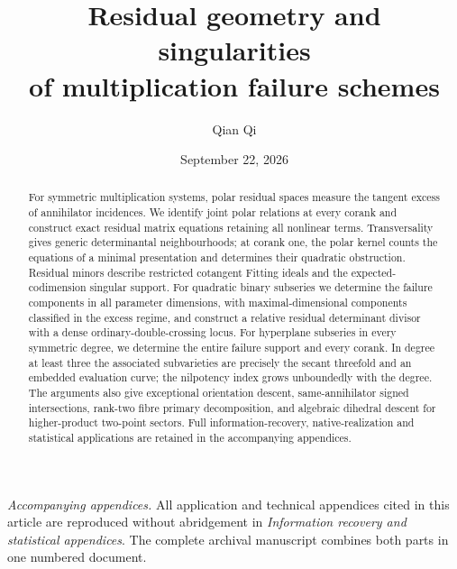 \documentclass[11pt,reqno]{amsart}
\title[Residual geometry of multiplication failure]{Residual geometry and singularities\\of multiplication failure schemes}
\author{Qian Qi}
\date{September 22, 2026}
\numberwithin{equation}{section}
\theoremstyle{definition}\newtheorem{definition}[theorem]{Definition}
\theoremstyle{remark}\newtheorem{remark}[theorem]{Remark}
\begin{document}
\begin{abstract}
For symmetric multiplication systems, polar residual spaces measure the tangent excess of annihilator incidences. We identify joint polar relations at every corank and construct exact residual matrix equations retaining all nonlinear terms. Transversality gives generic determinantal neighbourhoods; at corank one, the polar kernel counts the equations of a minimal presentation and determines their quadratic obstruction. Residual minors describe restricted cotangent Fitting ideals and the expected-codimension singular support. For quadratic binary subseries we determine the failure components in all parameter dimensions, with maximal-dimensional components classified in the excess regime, and construct a relative residual determinant divisor with a dense ordinary-double-crossing locus. For hyperplane subseries in every symmetric degree, we determine the entire failure support and every corank. In degree at least three the associated subvarieties are precisely the secant threefold and an embedded evaluation curve; the nilpotency index grows unboundedly with the degree. The arguments also give exceptional orientation descent, same-annihilator signed intersections, rank-two fibre primary decomposition, and algebraic dihedral descent for higher-product two-point sectors. Full information-recovery, native-realization and statistical applications are retained in the accompanying appendices.
\end{abstract}
\maketitle











\medskip
\noindent\emph{Accompanying appendices.} All application and technical
appendices cited in this article are reproduced without abridgement in
\emph{Information recovery and statistical appendices}. The complete
archival manuscript combines both parts in one numbered document.

\end{document}
